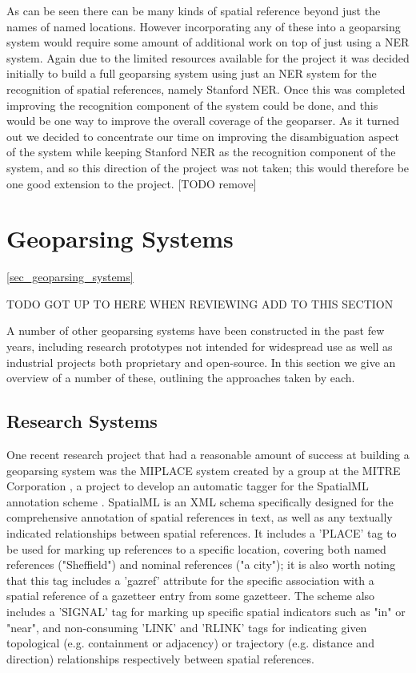 \documentclass[12pt, a4paper]{report}
\begin{document}
As can be seen there can be many kinds of spatial reference beyond just the names of named locations. However incorporating any of these into a geoparsing system would require some amount of additional work on top of just using a NER system. Again due to the limited resources available for the project it was decided initially to build a full geoparsing system using just an NER system for the recognition of spatial references, namely Stanford NER. Once this was completed improving the recognition component of the system could be done, and this would be one way to improve the overall coverage of the geoparser. As it turned out we decided to concentrate our time on improving the disambiguation aspect of the system while keeping Stanford NER as the recognition component of the system, and so this direction of the project was not taken; this would therefore be one good extension to the project. [TODO remove]

\section{Geoparsing Systems}
\ref{sec_geoparsing_systems}

TODO GOT UP TO HERE WHEN REVIEWING ADD TO THIS SECTION

A number of other geoparsing systems have been constructed in the past few years, including research prototypes not intended for widespread use as well as industrial projects both proprietary and open-source. In this section we give an overview of a number of these, outlining the approaches taken by each.

\subsection{Research Systems}

One recent research project that had a reasonable amount of success at building a geoparsing system was the MIPLACE system created by a group at the MITRE Corporation \citep{mani2010}, a project to develop an automatic tagger for the SpatialML annotation scheme \citep{spatialml2009}. SpatialML is an XML schema specifically designed for the comprehensive annotation of spatial references in text, as well as any textually indicated relationships between spatial references. It includes a 'PLACE' tag to be used for marking up references to a specific location, covering both named references ("Sheffield") and nominal references ("a city"); it is also worth noting that this tag includes a 'gazref' attribute for the specific association with a spatial reference of a gazetteer entry from some gazetteer. The scheme also includes a 'SIGNAL' tag for marking up specific spatial indicators such as "in" or "near", and non-consuming 'LINK' and 'RLINK' tags for indicating given topological (e.g. containment or adjacency) or trajectory (e.g. distance and direction) relationships respectively between  spatial references.
\end{document}
